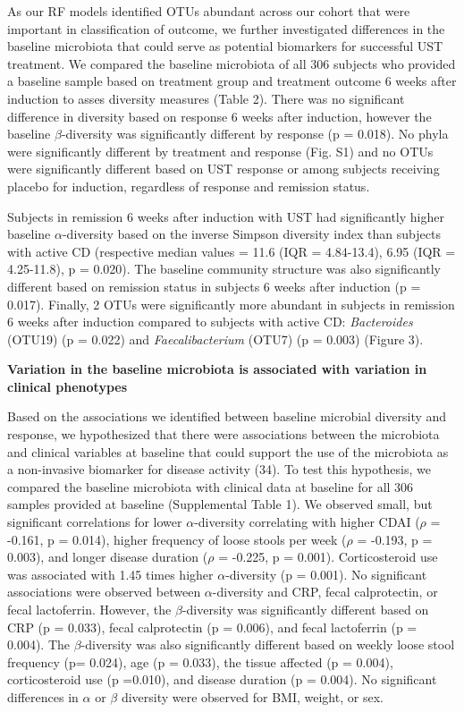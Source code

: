 \documentclass[12pt,]{article}
\begin{document}
As our RF models identified OTUs abundant across our cohort that were
important in classification of outcome, we further investigated
differences in the baseline microbiota that could serve as potential
biomarkers for successful UST treatment. We compared the baseline
microbiota of all 306 subjects who provided a baseline sample based on
treatment group and treatment outcome 6 weeks after induction to asses
diversity measures (Table 2). There was no significant difference in
diversity based on response 6 weeks after induction, however the
baseline \({\beta}\)-diversity was significantly different by response
(p = 0.018). No phyla were significantly different by treatment and
response (Fig. S1) and no OTUs were significantly different based on UST
response or among subjects receiving placebo for induction, regardless
of response and remission status.

Subjects in remission 6 weeks after induction with UST had significantly
higher baseline \({\alpha}\)-diversity based on the inverse Simpson
diversity index than subjects with active CD (respective median values =
11.6 (IQR = 4.84-13.4), 6.95 (IQR = 4.25-11.8), p = 0.020). The baseline
community structure was also significantly different based on remission
status in subjects 6 weeks after induction (p = 0.017). Finally, 2 OTUs
were significantly more abundant in subjects in remission 6 weeks after
induction compared to subjects with active CD: \emph{Bacteroides}
(OTU19) (p = 0.022) and \emph{Faecalibacterium} (OTU7) (p = 0.003)
(Figure 3).

\textbf{Variation in the baseline microbiota is associated with
variation in clinical phenotypes}

Based on the associations we identified between baseline microbial
diversity and response, we hypothesized that there were associations
between the microbiota and clinical variables at baseline that could
support the use of the microbiota as a non-invasive biomarker for
disease activity (34). To test this hypothesis, we compared the baseline
microbiota with clinical data at baseline for all 306 samples provided
at baseline (Supplemental Table 1). We observed small, but significant
correlations for lower \({\alpha}\)-diversity correlating with higher
CDAI (\({\rho}\) = -0.161, p = 0.014), higher frequency of loose stools
per week (\({\rho}\) = -0.193, p = 0.003), and longer disease duration
(\({\rho}\) = -0.225, p = 0.001). Corticosteroid use was associated with
1.45 times higher \({\alpha}\)-diversity (p = 0.001). No significant
associations were observed between \({\alpha}\)-diversity and CRP, fecal
calprotectin, or fecal lactoferrin. However, the \({\beta}\)-diversity
was significantly different based on CRP (p = 0.033), fecal calprotectin
(p = 0.006), and fecal lactoferrin (p = 0.004). The
\({\beta}\)-diversity was also significantly different based on weekly
loose stool frequency (p= 0.024), age (p = 0.033), the tissue affected
(p = 0.004), corticosteroid use (p =0.010), and disease duration (p =
0.004). No significant differences in \({\alpha}\) or \({\beta}\)
diversity were observed for BMI, weight, or sex.
\end{document}
